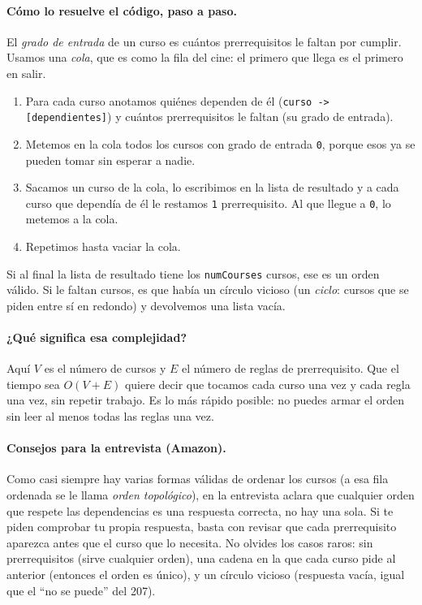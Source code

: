 \paragraph{Cómo lo resuelve el código, paso a paso.} El \emph{grado de entrada}
de un curso es cuántos prerrequisitos le faltan por cumplir. Usamos una
\emph{cola}, que es como la fila del cine: el primero que llega es el primero en
salir.
\begin{enumerate}
  \item Para cada curso anotamos quiénes dependen de él
        (\texttt{curso -> [dependientes]}) y cuántos prerrequisitos le faltan
        (su grado de entrada).
  \item Metemos en la cola todos los cursos con grado de entrada \texttt{0},
        porque esos ya se pueden tomar sin esperar a nadie.
  \item Sacamos un curso de la cola, lo escribimos en la lista de resultado y a
        cada curso que dependía de él le restamos \texttt{1} prerrequisito. Al
        que llegue a \texttt{0}, lo metemos a la cola.
  \item Repetimos hasta vaciar la cola.
\end{enumerate}
Si al final la lista de resultado tiene los \texttt{numCourses} cursos, ese es
un orden válido. Si le faltan cursos, es que había un círculo vicioso (un
\emph{ciclo}: cursos que se piden entre sí en redondo) y devolvemos una lista
vacía.




\paragraph{¿Qué significa esa complejidad?} Aquí $V$ es el número de cursos y
$E$ el número de reglas de prerrequisito. Que el tiempo sea $O(V+E)$ quiere
decir que tocamos cada curso una vez y cada regla una vez, sin repetir trabajo.
Es lo más rápido posible: no puedes armar el orden sin leer al menos todas las
reglas una vez.

\paragraph{Consejos para la entrevista (Amazon).} Como casi siempre hay varias
formas válidas de ordenar los cursos (a esa fila ordenada se le llama
\emph{orden topológico}), en la entrevista aclara que cualquier orden que
respete las dependencias es una respuesta correcta, no hay una sola. Si te piden
comprobar tu propia respuesta, basta con revisar que cada prerrequisito aparezca
antes que el curso que lo necesita. No olvides los casos raros: sin
prerrequisitos (sirve cualquier orden), una cadena en la que cada curso pide al
anterior (entonces el orden es único), y un círculo vicioso (respuesta vacía,
igual que el ``no se puede'' del 207).
